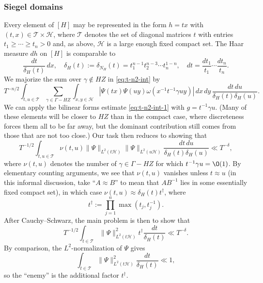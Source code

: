 \subsubsection{Siegel domains}\label{sec:crb1eg63zb}

Every element of $[H]$ may be represented in the form $h = t x$ with $(t,x) \in \mathcal{T} \times \mathcal{H}$, where $\mathcal{T}$ denotes the set of diagonal matrices $t$ with entries $t_1 \geq \dotsb \geq t_n > 0$ and, as above, $\mathcal{H}$ is a large enough fixed compact set.  The Haar measure $d h$ on $[H]$ is comparable to
\begin{equation*}
  \frac{d t}{\delta_H(t)} \, d x,
  \quad \delta_H(t) := \delta_{N_H}(t) = t_1^{n-1} t_2^{n-3} \dotsb t_n^{1-n},
  \quad
  d t = \frac{d t_1}{t_1} \dotsb \frac{d t_n}{t_n}.
\end{equation*}
We majorize the sum over $\gamma \notin H Z$ in \eqref{eq:t-n2-int} by
\begin{equation*}
  T^{-n/2}   \int_{t, u \in \mathcal{T}  }
  \sum_{\gamma \in \Gamma  - H Z}
  \int_{x,y \in \mathcal{H} }
  \left\lvert
    \Psi(t x)
    \Psi(u y)
    \omega(x^{-1} t^{-1}  \gamma u y)
  \right\rvert
  \, d x \, d y \, \frac{d t \, d u}{\delta_H(t) \delta_H(u)}.
\end{equation*}
We can apply the bilinear forms estimate \eqref{eq:t-n2-int-1} with $g = t^{-1} \gamma u$.  (Many of these elements will be closer to $H Z$ than in the compact case, where discreteness forces them all to be far away, but the dominant contribution still comes from those that are not too close.)  Our task then reduces to showing that
\begin{equation*}
  T^{-1/2}
  \int_{t, u \in \mathcal{T} }
  \nu(t,u)
  \|\Psi \|_{L^2(t \mathcal{H})}
  \|\Psi \|_{L^2(u \mathcal{H})}
  \frac{d t \, d u}{\delta_H(t) \delta_H(u)} \ll T^{-\delta},
\end{equation*}
where $\nu(t,u)$ denotes the number of $\gamma \in \Gamma - H Z$ for which $t^{-1} \gamma u = \O(1)$.  By elementary counting arguments, we see that $\nu(t,u)$ vanishes unless $t \approx u$ (in this informal discussion, take ``$A \approx B$'' to mean that $A B^{-1}$ lies in some essentially fixed compact set), in which case $\nu(t,u) \approx \delta_H(t) t^\dagger$, where
\begin{equation}\label{eq:t-dagger-:=}
  t^\dagger := \prod_{j=1}^n \max(t_j, t_j^{-1}).
\end{equation}
After Cauchy--Schwarz, the main problem is then to show that
\begin{equation}\label{eq:t-14-int}
  T^{-1/2}
  \int_{t  \in \mathcal{T} }
  \|\Psi \|_{L^2(t \mathcal{H})}^2
  t^\dagger
  \frac{d t}{\delta_H(t)} \ll T^{-\delta}.
\end{equation}
By comparison, the $L^2$-normalization of $\Psi$ gives
\begin{equation*}
  \int_{t  \in \mathcal{T} }
  \|\Psi \|_{L^2(t \mathcal{H})}^2
  \frac{d t}{\delta_H(t)} \ll 1,
\end{equation*}
so the ``enemy'' is the additional factor $t^\dagger$.

